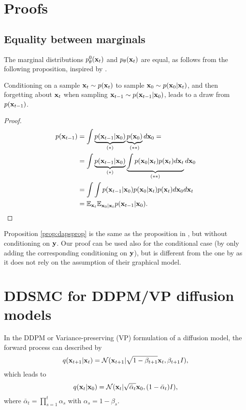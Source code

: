 

\section{Proofs}
\label{app:proofs}
\subsection{Equality between marginals}
The marginal distributions $p_\theta^0(\mathbf{x}_{t})$ and $p_\theta(\mathbf{x}_{t})$ are equal, as follows from the following proposition, inspired by \citet{zhang_improving_2024}.
\begin{proposition}
Conditioning on a sample $\mathbf{x}_{t} \sim p(\mathbf{x}_{t})$ to sample $\mathbf{x}_0 \sim p(\mathbf{x}_0|\mathbf{x}_{t})$, and then forgetting about $\mathbf{x}_{t}$ when sampling $\mathbf{x}_{t-1} \sim p(\mathbf{x}_{t-1}|\mathbf{x}_0)$, leads to a draw from $p(\mathbf{x}_{t-1})$. 
\label{prop:dapsprop}
\end{proposition}
\begin{proof}
\begin{align}
p(\mathbf{x}_{t-1}) &= 
\int \underbrace{p(\mathbf{x}_{t-1} |\mathbf{x}_0)}_{(*)}\underbrace{p(\mathbf{x}_0)}_{(**)}d\mathbf{x}_0 = \\
&= \int  \underbrace{p(\mathbf{x}_{t-1} |\mathbf{x}_0)}_{(*)} \underbrace{\int p(\mathbf{x}_0|\mathbf{x}_{t}) p(\mathbf{x}_{t}) d\mathbf{x}_t}_{(**)} d\mathbf{x}_0 \\
&= \int \int p(\mathbf{x}_{t-1} |\mathbf{x}_0) p(\mathbf{x}_0|\mathbf{x}_{t}) p(\mathbf{x}_{t}) d\mathbf{x}_0 d\mathbf{x}_t \\
&= \mathbb{E}_{\mathbf{x}_{t}}
\mathbb{E}_{\mathbf{x}_0|\mathbf{x}_{t}}
p(\mathbf{x}_{t-1}|\mathbf{x}_0).
\label{eq:prop1proof}
\end{align}
\end{proof}
\begin{remark}
Proposition \ref{prop:dapsprop} is the same as the proposition in \citep{zhang_improving_2024}, but without conditioning on $\mathbf{y}$. Our proof can be used also for the conditional case (by only adding the corresponding conditioning on $\mathbf{y}$), but is different from the one by \citet{zhang_improving_2024} as it does not rely on the assumption of their graphical model.
\end{remark}

\section{DDSMC for DDPM/VP diffusion models}
\label{app:ddsmc_ddpm}
In the DDPM \citep{ho_denoising_2020-2} or Variance-preserving (VP) \citep{song_score-based_2021} formulation of a diffusion model, the forward process can described by
\begin{align}
    q(\mathbf{x}_{t+1}|\mathbf{x}_{t}) = \mathcal{N}(\mathbf{x}_{t+1}|\sqrt{1-\beta_{t+1}}\mathbf{x}_{t}, \beta_{t+1}I), \label{eq:ddpmforward}
\end{align}
which leads to 
\begin{align}
    q(\mathbf{x}_{t}|\mathbf{x}_0) = \mathcal{N}(\mathbf{x}_{t}|\sqrt{\bar\alpha_t}\mathbf{x}_0, (1-\bar\alpha_t)I), \label{eq:ddpmtzero}
\end{align}
where $\bar \alpha_t = \prod_{s=1}^t\alpha_s$ with $\alpha_s = 1 - \beta_s$.

